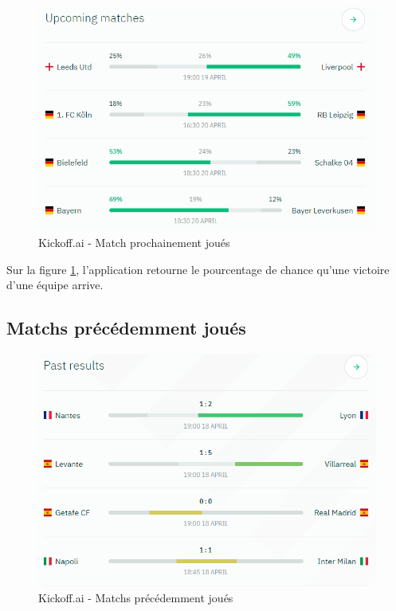 \documentclass[a4paper,14pt]{extarticle}
\begin{document}
{\begin{figure}[H]
    \centering
    \includegraphics[width=12cm]{../img/upcomingMatches.png}
    \caption{Kickoff.ai - Match prochainement joués}
    \label{fig:kickoff.ai_upcomingmatches}
\end{figure}

Sur la figure \ref{fig:kickoff.ai_upcomingmatches}, l'application retourne le pourcentage de chance qu'une victoire d'une équipe arrive.

\subsection{Matchs précédemment joués}

\begin{figure}[H]
    \centering
    \includegraphics[width=12cm]{../img/pastResults.png}
    \caption{Kickoff.ai - Matchs précédemment joués}
    \label{fig:kickoff.ai_pastresults}
\end{figure}

}
\end{document}
